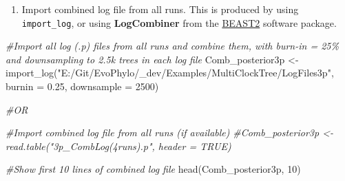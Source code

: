\documentclass[
]{article}
\newenvironment{Shaded}{\begin{snugshade}}{\end{snugshade}}
\newcommand{\AttributeTok}[1]{\textcolor[rgb]{0.77,0.63,0.00}{#1}}
\newcommand{\CommentTok}[1]{\textcolor[rgb]{0.56,0.35,0.01}{\textit{#1}}}
\newcommand{\DecValTok}[1]{\textcolor[rgb]{0.00,0.00,0.81}{#1}}
\newcommand{\FloatTok}[1]{\textcolor[rgb]{0.00,0.00,0.81}{#1}}
\newcommand{\FunctionTok}[1]{\textcolor[rgb]{0.00,0.00,0.00}{#1}}
\newcommand{\NormalTok}[1]{#1}
\newcommand{\OtherTok}[1]{\textcolor[rgb]{0.56,0.35,0.01}{#1}}
\newcommand{\StringTok}[1]{\textcolor[rgb]{0.31,0.60,0.02}{#1}}
\providecommand{\tightlist}{%
  \setlength{\itemsep}{0pt}\setlength{\parskip}{0pt}}
\begin{document}
\begin{enumerate}
\def\labelenumi{\arabic{enumi}.}
\setcounter{enumi}{1}
\tightlist
\item
  Import combined log file from all runs. This is produced by using
  \texttt{import\_log}, or using \textbf{LogCombiner} from the
  \href{https://www.beast2.org/beagle-beast-2-in-cluster/index.html}{BEAST2}
  software package.
\end{enumerate}

\begin{Shaded}
\begin{Highlighting}[]
\CommentTok{\#Import all log (.p) files from all runs and combine them, with burn{-}in = 25\% and downsampling to 2.5k trees in each log file}
\NormalTok{Comb\_posterior3p }\OtherTok{\textless{}{-}} \FunctionTok{import\_log}\NormalTok{(}\StringTok{"E:/Git/EvoPhylo/\_dev/Examples/MultiClockTree/LogFiles3p"}\NormalTok{, }\AttributeTok{burnin =} \FloatTok{0.25}\NormalTok{, }\AttributeTok{downsample =} \DecValTok{2500}\NormalTok{)}

\CommentTok{\#OR}

\CommentTok{\#Import combined log file from all runs (if available)}
\CommentTok{\#Comb\_posterior3p \textless{}{-} read.table("3p\_CombLog(4runs).p", header = TRUE)}

\CommentTok{\#Show first 10 lines of combined log file}
\FunctionTok{head}\NormalTok{(Comb\_posterior3p, }\DecValTok{10}\NormalTok{)}
\end{Highlighting}
\end{Shaded}
\end{document}
